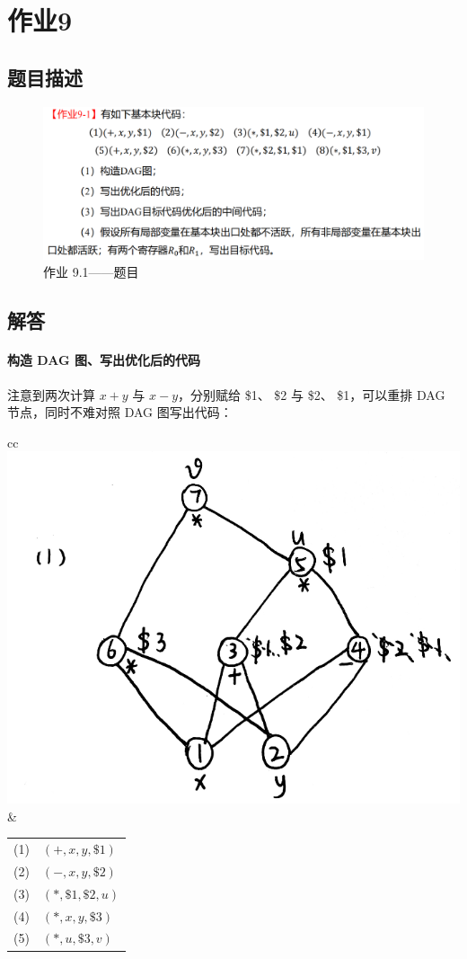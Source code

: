 
\section{作业9}
\subsection{题目描述}
\begin{figure}[H]
    \centering
    \includegraphics[width=0.9\linewidth]{imgs/9_1.png}
    \caption{作业 9.1——题目}
    \label{fig:9_1_prob}
\end{figure}
\subsection{解答}
\paragraph{构造 DAG 图、写出优化后的代码} 注意到两次计算 $x+y$ 与 $x-y$，分别赋给 \$1、 \$2 与 \$2、 \$1，可以重排 DAG 节点，同时不难对照 DAG 图写出代码：


\begin{table}[H]
    \centering
    \begin{tabular}{cc}
    \centering
    \includegraphics[width=0.4\linewidth]{imgs/9_1_1.png}
    & 
\begin{tabular}{rl}
(1) & $(+, x, y, \$1)$ \\
(2) & $(-, x, y, \$2)$ \\
(3) & $(*, \$1, \$2, u)$ \\
(4) & $(*, x, y, \$3)$ \\
(5) & $(*, u, \$3, v)$
\end{tabular}
\\
    \end{tabular}
\end{table}

